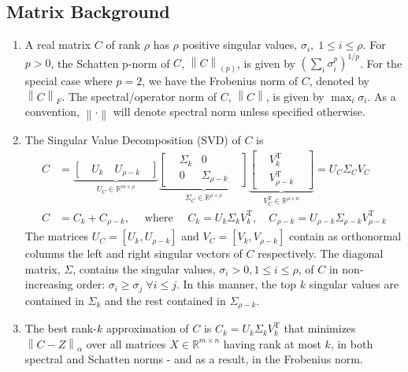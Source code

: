 \documentclass[11pt]{article}
\def\reals{\mathbb{R}}
\newcommand{\norm}[1]{\left\|#1\right\|}
\begin{document}
\subsection{Matrix Background}
\begin{enumerate}
\item A real matrix $C$ of rank $\rho$ has $\rho$ positive singular values, $\sigma_i, \; 1 \leq i \leq \rho$. For $p > 0$, the Schatten p-norm of $C$, $\norm{C}_{(p)}$, is given by $\left( \sum_i \sigma_i ^p \right)^{1/p}$. For the special case where $p=2$, we have the Frobenius norm of $C$, denoted by $\norm{C}_F$. The spectral/operator norm of $C$, $\norm{C}$, is given by $\displaystyle \max_i \sigma_i$. As a convention, $\norm{ \cdot }$ will denote spectral norm unless specified otherwise. 

\item The Singular Value Decomposition (SVD) of $C$ is
\begin{align*}
C &= \underbrace{[ \quad U_k \quad U_{\rho - k} \quad ]}_\text{$U_C \in \reals^{m \times \rho}$}
\underbrace{\begin{bmatrix}
&\Sigma_k & 0 &\\
&0 & \Sigma_{\rho - k}&
\end{bmatrix}}_\text{$\Sigma_C \in \reals^{\rho \times \rho}$}
\underbrace{\begin{bmatrix}
&V_k^{\text{T}}&\\
&V_{\rho - k}^{\text{T}}&
\end{bmatrix}}_\text{$V_C^{\text{T}} \in \reals^{\rho \times n}$} = U_C\Sigma_C V_C\\
C & = C_k + C_{\rho - k}, \quad \text{ where } \quad C_k  = U_k\Sigma_kV_k^{\text{T}}, \quad  C_{\rho - k}  = U_{\rho - k}\Sigma_{\rho - k}V_{\rho -k}^{\text{T}}
\end{align*} 
The matrices $U_C = [U_k, U_{\rho - k}]$ and $V_C = [V_k, V_{\rho - k}]$ contain as orthonormal columns the left and right singular vectors of $C$ respectively. The diagonal matrix, $\Sigma$, contains the singular values, $\sigma_i > 0, 1 \leq i \leq \rho$, of $C$ in non-increasing order: $\sigma_{i} \geq \sigma_{j}\; \forall i \leq j$. In this manner, the top $k$ singular values are contained in $\Sigma_k$ and the rest contained in $\Sigma_{\rho - k}$. 

\item The best rank-$k$ approximation of $C$ is $C_k = U_k\Sigma_kV_k^{\text{T}}$ that minimizes $\norm{C - Z}_{\alpha}$ over all matrices $X \in \reals^{m \times n}$ having rank at most $k$, in both spectral and Schatten norms - and as a result, in the Frobenius norm. 


\end{enumerate}
\end{document}
